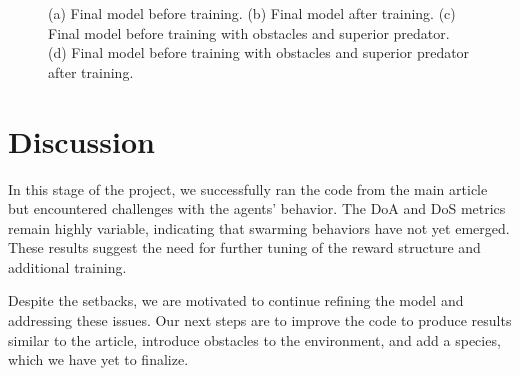 \documentclass[9pt]{pnas-new}
\begin{document}
\begin{figure}[ht]
	\caption{(a) Final model before training. (b) Final model after training. (c) Final model before training with obstacles and superior predator. (d) Final model before training with obstacles and superior predator after training. }
	\label{fig:final}
\end{figure}


\section*{Discussion}
In this stage of the project, we successfully ran the code from the main article but encountered challenges with the agents' behavior. 
The DoA and DoS metrics remain highly variable, indicating that swarming behaviors have not yet emerged. 
These results suggest the need for further tuning of the reward structure and additional training.

Despite the setbacks, we are motivated to continue refining the model and addressing these issues. 
Our next steps are to improve the code to produce results similar to the article, introduce obstacles to the environment, and add a species, which we have yet to finalize.

\showacknow %


\begin{multicols}{2}
\end{multicols}
\end{document}
